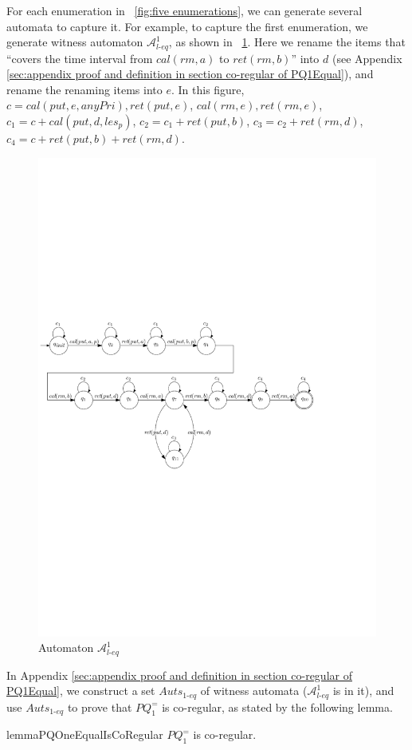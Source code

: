 For each enumeration in \figurename~\ref{fig:five enumerations}, we can generate several automata to capture it. For example, to capture the first enumeration, we generate witness automaton $\mathcal{A}_{\textit{l-eq}}^1$, as shown in \figurename~\ref{fig:automata for first enumeration of PQ1Equal not in appendix}. Here we rename the items that ``covers the time interval from $\textit{cal}(\textit{rm},a)$ to $\textit{ret}(\textit{rm},b)$'' into $d$ (see Appendix \ref{sec:appendix proof and definition in section co-regular of PQ1Equal}), and rename the renaming items into $e$. In this figure, $c = \textit{cal}(\textit{put},e,\textit{anyPri}),\textit{ret}(\textit{put},e)$, $\textit{cal}(\textit{rm},e), \textit{ret}(\textit{rm},e)$, $c_1 = c + \textit{cal}(\textit{put},d,\textit{les}_p)$, $c_2 = c_1 + \textit{ret}(\textit{put},b)$, $c_3 = c_2 + \textit{ret}(\textit{rm},d)$, $c_4 = c + \textit{ret}(\textit{put},b) + \textit{ret}(\textit{rm},d)$.

\begin{figure}[htbp]
  \centering
  \includegraphics[width=0.8 \textwidth]{figures/PIC_AUTO_PQ1Equ-1.pdf}
  \caption{Automaton $\mathcal{A}_{\textit{l-eq}}^1$}
  \label{fig:automata for first enumeration of PQ1Equal not in appendix}
\end{figure}

In Appendix \ref{sec:appendix proof and definition in section co-regular of PQ1Equal}, we construct a set $\textit{Auts}_{\textit{1-eq}}$ of witness automata ($\mathcal{A}_{\textit{l-eq}}^1$ is in it), and use $\textit{Auts}_{\textit{1-eq}}$ to prove that $\textit{PQ}_1^{=}$ is co-regular, as stated by the following lemma.


\begin{restatable}{lemma}{PQOneEqualIsCoRegular}
\label{lemma:Rpr2 is co-regular}
$\textit{PQ}_1^{=}$ is co-regular.
\end{restatable}
